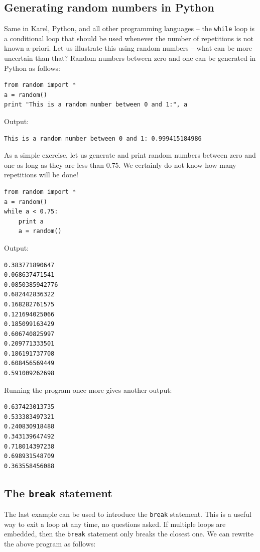 \subsection{Generating random numbers in Python}

Same in Karel, Python, and all other programming 
languages -- the {\tt while} loop is a conditional loop that should be used whenever the number of repetitions 
is not known a-priori. Let us illustrate this using random numbers -- what can be more uncertain than that?
Random numbers between 
zero and one can be generated in Python as follows:

\begin{verbatim}
from random import *
a = random()
print "This is a random number between 0 and 1:", a
\end{verbatim}
Output:

\begin{verbatim}
This is a random number between 0 and 1: 0.999415184986
\end{verbatim}
As a simple exercise, let us generate and print random numbers between 
zero and one as long as they are less than 0.75. We certainly do not know 
how many repetitions will be done!

\begin{verbatim}
from random import *
a = random()
while a < 0.75:
    print a
    a = random()
\end{verbatim}
Output:

\begin{verbatim}
0.383771890647
0.068637471541
0.0850385942776
0.682442836322
0.168282761575
0.121694025066
0.185099163429
0.606740825997
0.209771333501
0.186191737708
0.608456569449
0.591009262698
\end{verbatim}
Running the program once more gives another output:

\begin{verbatim}
0.637423013735
0.533383497321
0.240830918488
0.343139647492
0.718014397238
0.698931548709
0.363558456088
\end{verbatim}

\subsection{The {\tt break} statement}

The last example can be used to 
introduce the {\tt break} statement. This is a useful way to exit a loop at any time,
no questions asked.
If multiple loops are embedded, then the {\tt break} statement only breaks the closest 
one. We can rewrite the above program as follows: 

